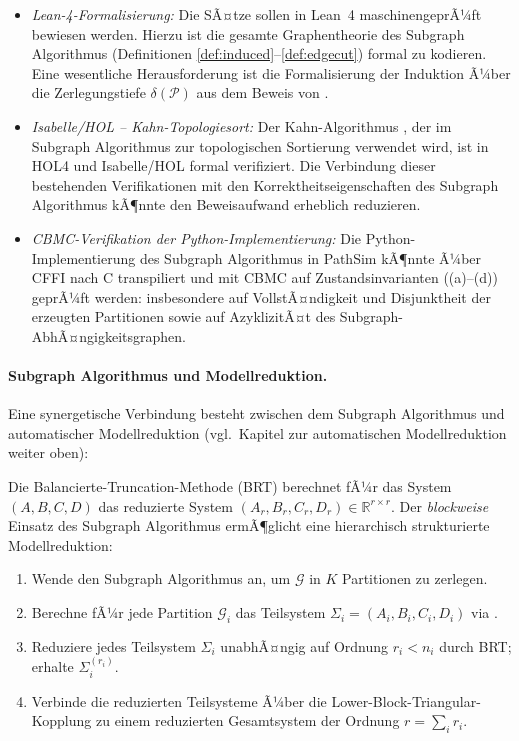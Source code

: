 ﻿\documentclass[12pt,a4paper]{article}
\theoremstyle{definition}
\begin{document}
\begin{itemize}[nosep]
  \item \emph{Lean-4-Formalisierung:} Die SÃ¤tze
        sollen in Lean~4 maschinengeprÃ¼ft bewiesen werden. Hierzu
        ist die gesamte Graphentheorie des Subgraph Algorithmus
        (Definitionen \ref{def:induced}--\ref{def:edgecut}) formal
        zu kodieren. Eine wesentliche Herausforderung ist die
        Formalisierung der Induktion Ã¼ber die Zerlegungstiefe
        $\delta(\mathcal{P})$ aus dem Beweis von .

  \item \emph{Isabelle/HOL -- Kahn-Topologiesort:} Der Kahn-Algorithmus
        \cite{kahn1962}, der im Subgraph Algorithmus zur topologischen
        Sortierung verwendet wird, ist in HOL4 und Isabelle/HOL
        formal verifiziert. Die Verbindung dieser bestehenden
        Verifikationen mit den Korrektheitseigenschaften des Subgraph
        Algorithmus kÃ¶nnte den Beweisaufwand erheblich reduzieren.

  \item \emph{CBMC-Verifikation der Python-Implementierung:} Die
        Python-Implementierung des Subgraph Algorithmus in PathSim
        kÃ¶nnte Ã¼ber CFFI nach C transpiliert und mit CBMC auf
        Zustandsinvarianten ((a)--(d)) geprÃ¼ft
        werden: insbesondere auf VollstÃ¤ndigkeit und Disjunktheit
        der erzeugten Partitionen sowie auf AzyklizitÃ¤t des
        Subgraph-AbhÃ¤ngigkeitsgraphen.
\end{itemize}

\paragraph{Subgraph Algorithmus und Modellreduktion.}
Eine synergetische Verbindung besteht zwischen dem Subgraph Algorithmus
und automatischer Modellreduktion
(vgl.\ Kapitel zur automatischen Modellreduktion weiter oben):

Die Balancierte-Truncation-Methode (BRT) berechnet fÃ¼r das
System $(A, B, C, D)$ das reduzierte System
$(A_r, B_r, C_r, D_r) \in \mathbb{R}^{r \times r}$.
Der \emph{blockweise} Einsatz des Subgraph Algorithmus ermÃ¶glicht
eine hierarchisch strukturierte Modellreduktion:

\begin{enumerate}[label=(\roman*), nosep]
  \item Wende den Subgraph Algorithmus an, um $\mathcal{G}$ in $K$
        Partitionen zu zerlegen.
  \item Berechne fÃ¼r jede Partition $\mathcal{G}_i$ das Teilsystem
        $\Sigma_i = (A_i, B_i, C_i, D_i)$ via .
  \item Reduziere jedes Teilsystem $\Sigma_i$ unabhÃ¤ngig auf
        Ordnung $r_i < n_i$ durch BRT; erhalte $\Sigma_i^{(r_i)}$.
  \item Verbinde die reduzierten Teilsysteme Ã¼ber die
        Lower-Block-Triangular-Kopplung zu einem reduzierten
        Gesamtsystem der Ordnung $r = \sum_i r_i$.
\end{enumerate}
\end{document}
